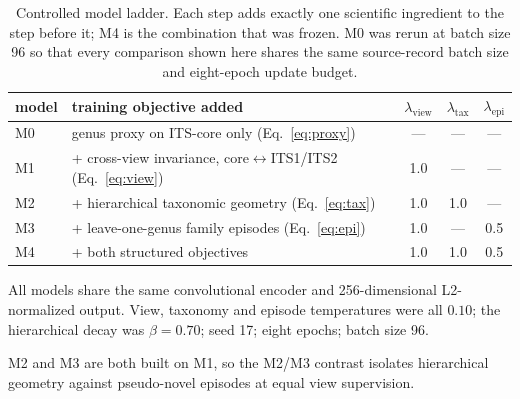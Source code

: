 \begin{table}[htbp]\centering
\begin{threeparttable}
\caption{Controlled model ladder. Each step adds exactly one scientific ingredient
to the step before it; M4 is the combination that was frozen. M0 was rerun at batch
size 96 so that every comparison shown here shares the same source-record batch size
and eight-epoch update budget.}
\label{tab:objectives}
\begin{tabular}{llccc}
\toprule
model & training objective added & $\lambda_{\mathrm{view}}$ & $\lambda_{\mathrm{tax}}$ & $\lambda_{\mathrm{epi}}$ \\
\midrule
M0 & genus proxy on ITS-core only (Eq.~\ref{eq:proxy}) & --- & --- & --- \\
M1 & \quad + cross-view invariance, core$\leftrightarrow$ITS1/ITS2 (Eq.~\ref{eq:view}) & 1.0 & --- & --- \\
M2 & \quad + hierarchical taxonomic geometry (Eq.~\ref{eq:tax}) & 1.0 & 1.0 & --- \\
M3 & \quad + leave-one-genus family episodes (Eq.~\ref{eq:epi}) & 1.0 & --- & 0.5 \\
M4 & \quad + both structured objectives & 1.0 & 1.0 & 0.5 \\
\bottomrule
\end{tabular}
\begin{tablenotes}\footnotesize
\item All models share the same convolutional encoder and 256-dimensional
L2-normalized output. View, taxonomy and episode temperatures were all $0.10$;
the hierarchical decay was $\beta=0.70$; seed 17; eight epochs; batch size 96.
\item M2 and M3 are both built on M1, so the M2/M3 contrast isolates hierarchical
geometry against pseudo-novel episodes at equal view supervision.
\end{tablenotes}
\end{threeparttable}
\end{table}
